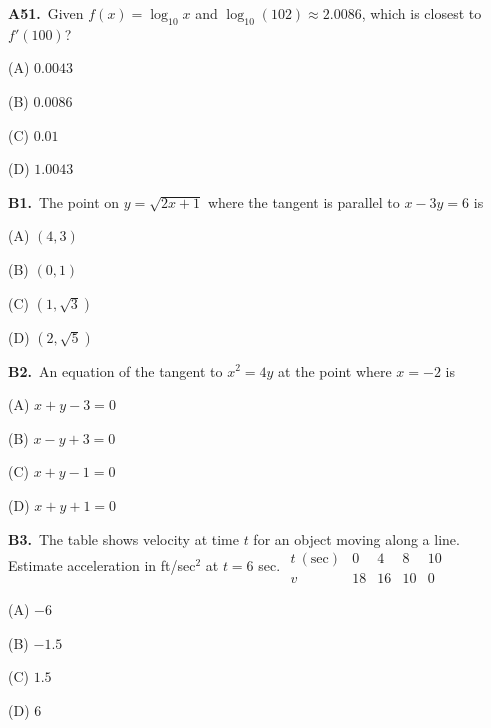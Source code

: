 \documentclass[11pt]{article}
\begin{document}
\bigskip\noindent\textbf{A51.}\ Given $f(x) = \log_{10}x$ and $\log_{10}(102) \approx 2.0086$, which is closest to $f'(100)$?
\begin{list}{}{\setlength{\leftmargin}{3em}\setlength{\labelwidth}{2.5em}\setlength{\itemsep}{0pt}\setlength{\topsep}{2pt}}
\item[(A)] $0.0043$
\item[(B)] $0.0086$
\item[(C)] $0.01$
\item[(D)] $1.0043$
\end{list}

\bigskip\noindent\textbf{B1.}\ The point on $y=\sqrt{2x+1}$ where the tangent is parallel to $x-3y=6$ is
\begin{list}{}{\setlength{\leftmargin}{3em}\setlength{\labelwidth}{2.5em}\setlength{\itemsep}{0pt}\setlength{\topsep}{2pt}}
\item[(A)] $(4,3)$
\item[(B)] $(0,1)$
\item[(C)] $(1,\sqrt3)$
\item[(D)] $(2,\sqrt5)$
\end{list}

\bigskip\noindent\textbf{B2.}\ An equation of the tangent to $x^2=4y$ at the point where $x=-2$ is
\begin{list}{}{\setlength{\leftmargin}{3em}\setlength{\labelwidth}{2.5em}\setlength{\itemsep}{0pt}\setlength{\topsep}{2pt}}
\item[(A)] $x+y-3=0$
\item[(B)] $x-y+3=0$
\item[(C)] $x+y-1=0$
\item[(D)] $x+y+1=0$
\end{list}

\bigskip\noindent\textbf{B3.}\ The table shows velocity at time $t$ for an object moving along a line. Estimate acceleration in ft/sec$^2$ at $t=6$ sec. $\begin{array}{c|rrrr}t\ (\mathrm{sec})&0&4&8&10\\v&18&16&10&0\end{array}$
\begin{list}{}{\setlength{\leftmargin}{3em}\setlength{\labelwidth}{2.5em}\setlength{\itemsep}{0pt}\setlength{\topsep}{2pt}}
\item[(A)] $-6$
\item[(B)] $-1.5$
\item[(C)] $1.5$
\item[(D)] $6$
\end{list}
\end{document}
